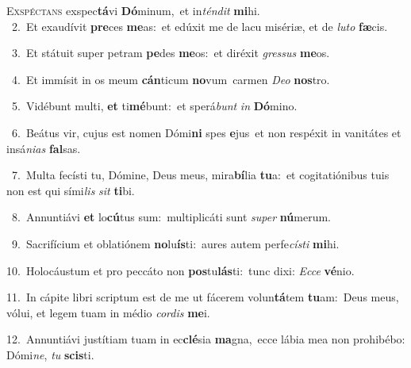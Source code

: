 \lettrine{\initial\textcolor{\initialcolor}{E}}{xspéctans} exspec\-\textbf{tá}\-vi \textbf{Dó}\-minum,~\star et in\-\textit{tén}\-\textit{dit} \textbf{mi}\-hi.\\
{\numbfont\textcolor{\numbcolor}{~2.}}~Et exaudívit \textbf{pre}\-ces \textbf{me}\-as:~\star et edúxit me de lacu misériæ, et de \textit{lu}\-\textit{to} \textbf{fæ}\-cis.\par
{\numbfont\textcolor{\numbcolor}{~3.}}~Et státuit super petram \textbf{pe}\-des \textbf{me}\-os:~\star et diréxit \textit{gres}\-\textit{sus} \textbf{me}\-os.\par
{\numbfont\textcolor{\numbcolor}{~4.}}~Et immísit in os meum \textbf{cán}\-ticum \textbf{no}\-vum~\star carmen \textit{De}\-\textit{o} \textbf{nos}\-tro.\par
{\numbfont\textcolor{\numbcolor}{~5.}}~Vidébunt multi, \textbf{et} ti\-\textbf{mé}\-bunt:~\star et sperá\textit{bunt} \textit{in} \textbf{Dó}\-mino.\par
{\numbfont\textcolor{\numbcolor}{~6.}}~Beátus vir, cujus est nomen Dómi\textbf{ni} spes \textbf{e}\-jus~\star et non respéxit in vanitátes et insá\-\textit{ni}\-\textit{as} \textbf{fal}\-sas.\par
{\numbfont\textcolor{\numbcolor}{~7.}}~Multa fecísti tu, Dómine, Deus meus, mira\-\textbf{bí}\-lia \textbf{tu}\-a:~\star et cogitatiónibus tuis non est qui sími\textit{lis} \textit{sit} \textbf{ti}\-bi.\par
{\numbfont\textcolor{\numbcolor}{~8.}}~Annuntiávi \textbf{et} lo\-\textbf{cú}\-tus sum:~\star multiplicáti sunt \textit{su}\-\textit{per} \textbf{nú}\-merum.\par
{\numbfont\textcolor{\numbcolor}{~9.}}~Sacrifícium et oblatiónem \textbf{no}\-lu\-\textbf{ís}\-ti:~\star aures autem perfe\-\textit{cís}\-\textit{ti} \textbf{mi}\-hi.\par
{\numbfont\textcolor{\numbcolor}{10.}}~Holocáustum et pro peccáto non \textbf{pos}\-tu\-\textbf{lás}\-ti:~\star tunc dixi: \textit{Ec}\-\textit{ce} \textbf{vé}\-nio.\par
{\numbfont\textcolor{\numbcolor}{11.}}~In cápite libri scriptum est de me ut fácerem volun\-\textbf{tá}\-tem \textbf{tu}\-am:~\star Deus meus, vólui, et legem tuam in médio \textit{cor}\-\textit{dis} \textbf{me}\-i.\par
{\numbfont\textcolor{\numbcolor}{12.}}~Annuntiávi justítiam tuam in ec\-\textbf{clé}\-sia \textbf{ma}\-gna,~\star ecce lábia mea non prohibébo: Dómi\-\textit{ne}\-, \textit{tu} \textbf{scis}\-ti.\par
